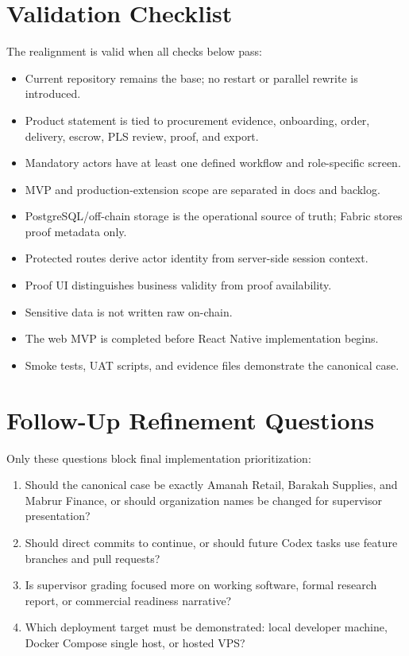 \documentclass[conference]{IEEEtran}
\begin{document}
\section{Validation Checklist}
The realignment is valid when all checks below pass:
\begin{itemize}
  \item Current repository remains the base; no restart or parallel rewrite is introduced.
  \item Product statement is tied to procurement evidence, onboarding, order, delivery, escrow, PLS review, proof, and export.
  \item Mandatory actors have at least one defined workflow and role-specific screen.
  \item MVP and production-extension scope are separated in docs and backlog.
  \item PostgreSQL/off-chain storage is the operational source of truth; Fabric stores proof metadata only.
  \item Protected routes derive actor identity from server-side session context.
  \item Proof UI distinguishes business validity from proof availability.
  \item Sensitive data is not written raw on-chain.
  \item The web MVP is completed before React Native implementation begins.
  \item Smoke tests, UAT scripts, and evidence files demonstrate the canonical case.
\end{itemize}

\section{Follow-Up Refinement Questions}
Only these questions block final implementation prioritization:
\begin{enumerate}
  \item Should the canonical case be exactly Amanah Retail, Barakah Supplies, and Mabrur Finance, or should organization names be changed for supervisor presentation?
  \item Should direct commits to  continue, or should future Codex tasks use feature branches and pull requests?
  \item Is supervisor grading focused more on working software, formal research report, or commercial readiness narrative?
  \item Which deployment target must be demonstrated: local developer machine, Docker Compose single host, or hosted VPS?
\end{enumerate}
\end{document}
